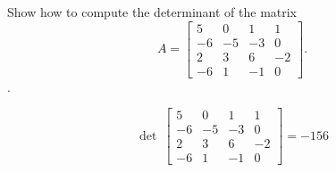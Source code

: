 
\begin{exerciseStatement}


Show how to compute the determinant of the matrix \[A= \left[\begin{array}{cccc}
5 & 0 & 1 & 1 \\
-6 & -5 & -3 & 0 \\
2 & 3 & 6 & -2 \\
-6 & 1 & -1 & 0
\end{array}\right] .\].


\end{exerciseStatement}
    
\begin{exerciseAnswer} 
\[\operatorname{det}\  \left[\begin{array}{cccc}
5 & 0 & 1 & 1 \\
-6 & -5 & -3 & 0 \\
2 & 3 & 6 & -2 \\
-6 & 1 & -1 & 0
\end{array}\right] = -156 \]
\end{exerciseAnswer}
    
